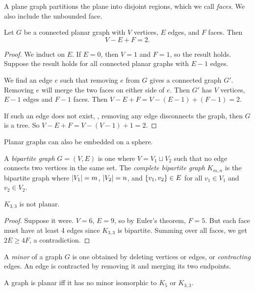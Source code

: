\begin{fact} \label{thm:planar_graphs:jordan}
    A plane graph partitions the plane into disjoint regions, which we call
    \emph{faces}.
    We also include the unbounded face.
\end{fact}
\begin{theorem*} \label{thm:planar_graphs:euler}
    Let $G$ be a connected planar graph with $V$ vertices, $E$ edges,
    and $F$ faces.
    Then \[
        V - E + F = 2.
    \]
\end{theorem*}
\begin{proof}
    We induct on $E$.
    If $E = 0$, then $V = 1$ and $F = 1$, so the result holds.
    Suppose the result holds for all connected planar graphs with $E - 1$
    edges.

    We find an edge $e$ such that removing $e$ from $G$ gives a connected
    graph $G'$.
    Removing $e$ will merge the two faces on either side of $e$.
    Then $G'$ has $V$ vertices, $E - 1$ edges and $F - 1$ faces.
    Then $V - E + F = V - (E-1) + (F-1) = 2$.

    If such an edge does not exist, \ie, removing any edge disconnects the
    graph, then $G$ is a tree.
    So $V - E + F = V - (V - 1) + 1 = 2$.
\end{proof}
\begin{remark}
    Planar graphs can also be embedded on a sphere.
\end{remark}

\begin{definition}  \label{def:planar_graphs:bipartite}
    A \emph{bipartite graph} $G = (V, E)$ is one where
    $V = V_1 \sqcup V_2$ such that no edge connects two vertices in the same
    set.
    The \emph{complete bipartite graph} $K_{m,n}$ is the bipartite graph
    where $\abs{V_1} = m$, $\abs{V_2} = n$, and $\set{v_1, v_2} \in E$ for
    all $v_1 \in V_1$ and $v_2 \in V_2$.
\end{definition}
\begin{corollary}
    $K_{3, 3}$ is not planar.
\end{corollary}
\begin{proof}
    Suppose it were.
    $V = 6$, $E = 9$, so by Euler's theorem, $F = 5$.
    But each face must have at least 4 edges since $K_{3, 3}$ is bipartite.
    Summing over all faces, we get $2E \geq 4F$, a contradiction.
\end{proof}

\begin{definition}[Minor] \label{def:planar_graphs:minor}
    A \emph{minor} of a graph $G$ is one obtained by deleting vertices or
    edges, or \emph{contracting} edges.
    An edge is contracted by removing it and merging its two endpoints.
\end{definition}
\begin{fact*} \label{thm:planar_graphs:kuratowski}
    A graph is planar iff it has no minor isomorphic to $K_5$ or $K_{3,3}$.
\end{fact*}

